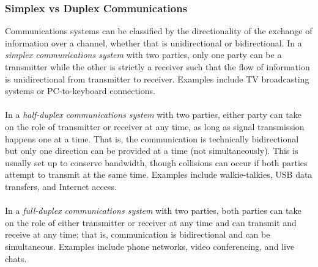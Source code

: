 \documentclass{report}
\begin{document}
\subsubsection{Simplex vs Duplex Communications}
Communications systems can be classified by the directionality of the exchange of information over a channel, whether that is unidirectional or bidirectional. In a \emph{simplex communications system} with two parties, 
only one party can be a transmitter while the other is strictly a receiver such that the flow of information is unidirectional from transmitter to receiver. Examples include TV broadcasting systems or PC-to-keyboard connections.
\\ \\
In a \emph{half-duplex communications system} with two parties, either party can take on the role of transmitter or receiver at any time, as long as signal transmission happens one at a time. That is, 
the communication is technically bidirectional but only one direction can be provided at a time (not simultaneously). This is usually set up to conserve bandwidth, though collisions can occur if both parties 
attempt to transmit at the same time. Examples include walkie-talkies, USB data transfers, and Internet access.
\\ \\
In a \emph{full-duplex communications system} with two parties, both parties can take on the role of either transmitter or receiver at any time and can transmit and receive at any time; that is, communication 
is bidirectional and can be simultaneous. Examples include phone networks, video conferencing, and live chats.
\end{document}
